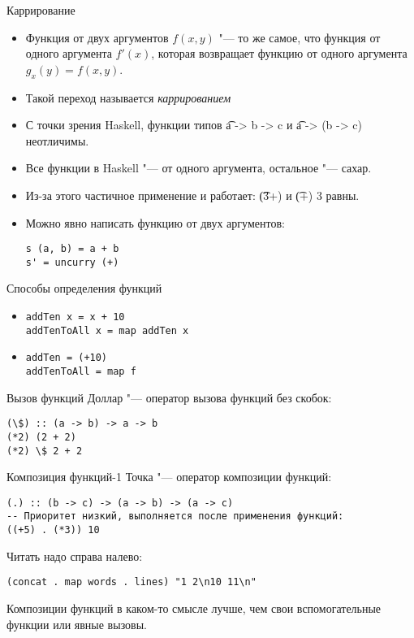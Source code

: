 \begin{frame}[fragile]{Каррирование}
	\begin{itemize}
		\item Функция от двух аргументов $f(x, y)$ "--- то же самое, что функция от одного аргумента $f'(x)$,
			которая возвращает функцию от одного аргумента $g_x(y)=f(x, y)$.
		\item Такой переход называется \textit{каррированием}
		\item С точки зрения Haskell, функции типов \t{a -> b -> c} и \t{a -> (b -> c)} неотличимы.
		\item Все функции в Haskell "--- от одного аргумента, остальное "--- сахар.
		\item Из-за этого частичное применение и работает: \t{(3+)} и \t{(+) 3} равны.
		\item Можно явно написать функцию от двух аргументов:
\begin{verbatim}
s (a, b) = a + b
s' = uncurry (+)
\end{verbatim}
	\end{itemize}
\end{frame}

\begin{frame}[fragile]{Способы определения функций}
	\begin{itemize}
		\item
\begin{verbatim}
addTen x = x + 10
addTenToAll x = map addTen x
\end{verbatim}
		\item
\begin{verbatim}
addTen = (+10)
addTenToAll = map f
\end{verbatim}
	\end{itemize}
\end{frame}

\begin{frame}[fragile]{Вызов функций}
	Доллар "--- оператор вызова функций без скобок:
\begin{verbatim}
(\$) :: (a -> b) -> a -> b
(*2) (2 + 2)
(*2) \$ 2 + 2
\end{verbatim}
\end{frame}

\begin{frame}[fragile]{Композиция функций-1}
	Точка "--- оператор композиции функций:
\begin{verbatim}
(.) :: (b -> c) -> (a -> b) -> (a -> c)
-- Приоритет низкий, выполняется после применения функций:
((+5) . (*3)) 10
\end{verbatim}
	Читать надо справа налево:
\begin{verbatim}
(concat . map words . lines) "1 2\n10 11\n"
\end{verbatim}
	Композиции функций в каком-то смысле лучше, чем свои вспомогательные функции или явные вызовы.
\end{frame}

